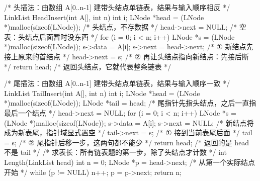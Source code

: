 \documentclass[10pt,a4paper]{ctexart}
\begin{document}



\begin{codebox}
/* 头插法：由数组 A[0..n-1] 建带头结点单链表，结果与输入顺序相反 */
LinkList HeadInsert(int A[], int n) {
    int i;
    LNode *head = (LNode *)malloc(sizeof(LNode));  /* 头结点，不存数据 */
    head->next = NULL;                             /* 空表：头结点后面暂时没东西 */
    for (i = 0; i < n; i++) {
        LNode *s = (LNode *)malloc(sizeof(LNode));
        s->data = A[i];
        s->next = head->next;   /* ① 新结点先接上原来的首结点 */
        head->next = s;         /* ② 再让头结点指向新结点：先接后断 */
    }
    return head;                /* 返回头结点，它就代表整条链表 */
}
\end{codebox}




\begin{codebox}
/* 尾插法：由数组 A[0..n-1] 建带头结点单链表，结果与输入顺序一致 */
LinkList TailInsert(int A[], int n) {
    int i;
    LNode *head = (LNode *)malloc(sizeof(LNode));
    LNode *tail = head;         /* 尾指针先指头结点，之后一直指最后一个结点 */
    head->next = NULL;
    for (i = 0; i < n; i++) {
        LNode *s = (LNode *)malloc(sizeof(LNode));
        s->data = A[i];
        s->next = NULL;         /* 新结点将成为新表尾，指针域显式置空 */
        tail->next = s;         /* ① 接到当前表尾后面 */
        tail = s;               /* ② 尾指针后移一步，这两句都不能少 */
    }
    return head;                /* 返回的是 head 不是 tail */
}
/* 求表长：所有链表题的第一步，除了头结点才计数 */
int Length(LinkList head) {
    int n = 0;
    LNode *p = head->next;      /* 从第一个实际结点开始 */
    while (p != NULL) { n++; p = p->next; }
    return n;
}
\end{codebox}

\end{document}
